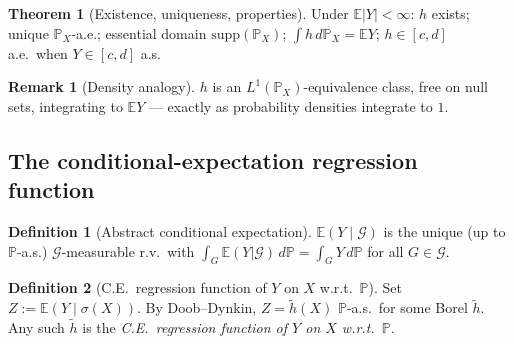 \documentclass[12pt, a4paper]{article}
\theoremstyle{definition}
\newtheorem{definition}{Definition}[section]
\newtheorem{theorem}{Theorem}[section]
\newtheorem{remark}{Remark}[section]
\newcommand{\E}{\mathbb{E}}
\newcommand{\R}{\mathbb{R}}
\newcommand{\Prob}{\mathbb{P}}
\newcommand{\sG}{\mathcal{G}}
\begin{document}
\begin{theorem}[Existence, uniqueness, properties]\label{thm:RNexist}
Under $\E|Y|<\infty$: $h$ exists; unique $\Prob_X$-a.e.; essential
domain $\mathrm{supp}(\Prob_X)$; $\int h\,d\Prob_X=\E Y$;
$h\in[c,d]$ a.e.\ when $Y\in[c,d]$ a.s.
\end{theorem}

\begin{remark}[Density analogy]
$h$ is an $L^1(\Prob_X)$-equivalence class, free on null sets,
integrating to $\E Y$ --- exactly as probability densities
integrate to $1$.
\end{remark}

\medskip
\begin{center}
\end{center}
\medskip

\subsection{The conditional-expectation regression function}

\begin{definition}[Abstract conditional expectation]\label{def:absCE}
$\E(Y\mid\sG)$ is the unique (up to $\Prob$-a.s.) $\sG$-measurable
r.v.\ with $\int_G\E(Y|\sG)\,d\Prob=\int_G Y\,d\Prob$
for all $G\in\sG$.
\end{definition}

\begin{definition}[C.E.\ regression function of $Y$ on $X$
  w.r.t.\ $\Prob$]\label{def:CEregfun}
Set $Z:=\E(Y\mid\sigma(X))$.  By Doob--Dynkin, $Z=\tilde h(X)$
$\Prob$-a.s.\ for some Borel $\tilde h$.
Any such $\tilde h$ is the \emph{C.E.\ regression function of $Y$
on $X$ w.r.t.\ $\Prob$}.
\end{definition}
\end{document}
